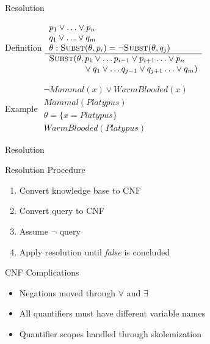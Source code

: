 \documentclass[14pt]{beamer}
\begin{document}
\begin{frame}{Resolution}
\begin{block}{Definition}
$
\begin{array}{l}
p_1 \lor \ldots \lor p_n \\
q_1 \lor \ldots \lor q_m \\
\theta : \textsc{Subst}(\theta, p_i) = \lnot\textsc{Subst}(\theta, q_j)\\
\hline
\textsc{Subst}(\theta, p_1 \lor \ldots p_{i-1} \lor p_{i+1} \ldots \lor p_n \\
\hspace{4em} \null \lor q_1 \lor \ldots q_{j-1} \lor q_{j+1}  \ldots \lor q_m)
\end{array}
$
\end{block}
\pause
\begin{block}{Example}
$
\begin{array}{l}
\lnot \textit{Mammal}(x) \lor \textit{WarmBlooded}(x) \\
\textit{Mammal}(\textit{Platypus}) \\
\theta = \{x = \textit{Platypus}\} \\
\hline
\textit{WarmBlooded}(\textit{Platypus})
\end{array}
$
\end{block}
\end{frame}

\begin{frame}{Resolution}
	\begin{block}{Resolution Procedure}
		\begin{enumerate}
			\item Convert knowledge base to CNF
			\item Convert query to CNF
			\item Assume $\lnot$ query
			\item Apply resolution until \textit{false} is concluded
		\end{enumerate}
	\end{block}
	\pause
	\begin{block}{CNF Complications}
		\begin{itemize}
			\item Negations moved through $\forall$ and $\exists$
			\item All quantifiers must have different variable names
			\item Quantifier scopes handled through \alert{skolemization}
		\end{itemize}
	\end{block}
\end{frame}
\end{document}
